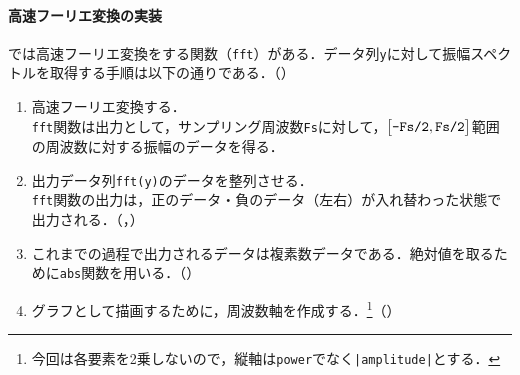 \paragraph{高速フーリエ変換の実装}
\matlab では高速フーリエ変換をする関数（\texttt{fft}）がある．データ列\texttt{y}に対して振幅スペクトルを取得する手順は以下の通りである．（）
\begin{enumerate}
    \item 高速フーリエ変換する．\\
          \texttt{fft}関数は出力として，サンプリング周波数\texttt{Fs}に対して，\(\big[\textrm{\texttt{-Fs/2}},\textrm{\texttt{Fs/2}}\big]\)範囲の周波数に対する振幅のデータを得る．
    \item 出力データ列\texttt{fft(y)}のデータを整列させる．\\
          \texttt{fft}関数の出力は，正のデータ・負のデータ（左右）が入れ替わった状態で出力される．（，）
    \item これまでの過程で出力されるデータは複素数データである．絶対値を取るために\texttt{abs}関数を用いる．（）
    \item グラフとして描画するために，周波数軸を作成する．\footnote{今回は各要素を2乗しないので，縦軸は\texttt{power}でなく\texttt{|amplitude|}とする．}（）
\end{enumerate}
